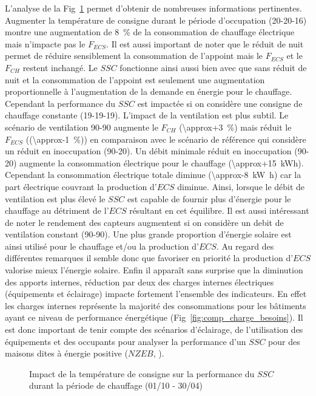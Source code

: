 L’analyse de la Fig~\ref{fig:impact_temp_consigne} permet d’obtenir de nombreuses
informations pertinentes. Augmenter la température de consigne durant le période
d’occupation (20-20-16) montre une augmentation de \SI{8}{\percent} de la consommation de
chauffage électrique mais n’impacte pas le $F_{ECS}$. Il est aussi important de noter que
le réduit de nuit permet de réduire sensiblement la consommation de l’appoint mais le
$F_{ECS}$ et le  $F_{CH}$ restent inchangé. Le $SSC$ fonctionne ainsi aussi bien avec que
sans réduit de nuit et la consommation de l’appoint est seulement une augmentation
proportionnelle à l’augmentation de la demande en énergie pour le chauffage. Cependant la
performance du $SSC$ est impactée si on considère une consigne de chauffage constante
(19-19-19). L’impact de la ventilation est plus subtil. Le scénario de ventilation 90-90
augmente le $F_{CH}$ (\SI{\approx+3}{\percent}) mais réduit le $F_{ECS}$
((\SI{\approx-1}{\percent})) en comparaison avec le scénario de référence qui considère un
réduit en inoccupation (90-20). Un débit minimale réduit en inoccupation (90-20) augmente
la consommation électrique pour le chauffage (\SI{\approx+15}{kWh}). Cependant la
consommation électrique totale diminue (\SI{\approx-8}{\kilo\watt\hour}) car la part
électrique couvrant la production d’$ECS$ diminue. Ainsi, lorsque le débit de ventilation
est plus élevé le $SSC$ est capable de fournir plus d’énergie pour le chauffage au
détriment de l’$ECS$ résultant en cet équilibre. Il est aussi intéressant de noter le
rendement des capteurs augmentent si on considère un debit de ventilation constant
(90-90). Une plus grande proportion d’énergie solaire est ainsi utilisé pour le chauffage
et/ou la production d’$ECS$. Au regard des différentes remarques il semble donc que
favoriser en priorité la production d’$ECS$ valorise mieux l’énergie solaire. Enfin il
apparaît sans surprise que la diminution des apports internes, réduction par deux des
charges internes électriques (équipements et éclairage) impacte fortement l’ensemble des
indicateurs. En effet les charges internes représente la majorité des consommations pour
les bâtiments ayant ce niveau de performance énergétique (Fig~\ref{fig:comp_charge_besoins}).
Il est donc important de tenir compte des scénarios d’éclairage, de l’utilisation des équipements
et des occupants pour analyser la performance d’un $SSC$ pour des maisons dites à énergie positive
($NZEB$, ).

\begin{figure}
    \begin{center}
    \end{center}
    \caption{Impact de la température de consigne sur la performance
             du $SSC$ durant la période de chauffage (01/10 - 30/04)
             \label{fig:impact_temp_consigne}}
\end{figure}

